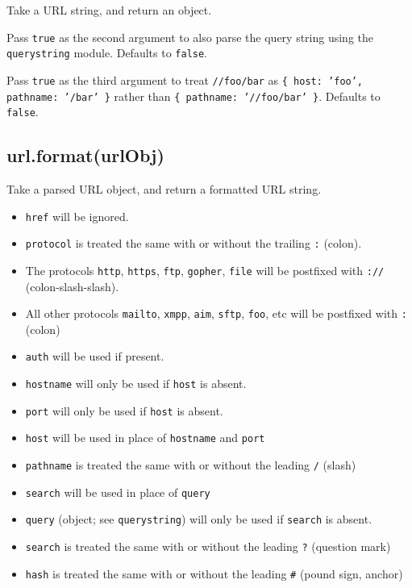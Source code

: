 Take a URL string, and return an object.

Pass \texttt{true} as the second argument to also parse the query string
using the \texttt{querystring} module. Defaults to \texttt{false}.

Pass \texttt{true} as the third argument to treat \texttt{//foo/bar} as
\texttt{\{ host: 'foo', pathname: '/bar' \}} rather than
\texttt{\{ pathname: '//foo/bar' \}}. Defaults to \texttt{false}.

\subsection{url.format(urlObj)}\label{url.formaturlobj}

Take a parsed URL object, and return a formatted URL string.

\begin{itemize}
\itemsep1pt\parskip0pt
\item
  \texttt{href} will be ignored.
\item
  \texttt{protocol} is treated the same with or without the trailing
  \texttt{:} (colon).
\item
  The protocols \texttt{http}, \texttt{https}, \texttt{ftp},
  \texttt{gopher}, \texttt{file} will be postfixed with \texttt{://}
  (colon-slash-slash).
\item
  All other protocols \texttt{mailto}, \texttt{xmpp}, \texttt{aim},
  \texttt{sftp}, \texttt{foo}, etc will be postfixed with \texttt{:}
  (colon)
\item
  \texttt{auth} will be used if present.
\item
  \texttt{hostname} will only be used if \texttt{host} is absent.
\item
  \texttt{port} will only be used if \texttt{host} is absent.
\item
  \texttt{host} will be used in place of \texttt{hostname} and
  \texttt{port}
\item
  \texttt{pathname} is treated the same with or without the leading
  \texttt{/} (slash)
\item
  \texttt{search} will be used in place of \texttt{query}
\item
  \texttt{query} (object; see \texttt{querystring}) will only be used if
  \texttt{search} is absent.
\item
  \texttt{search} is treated the same with or without the leading
  \texttt{?} (question mark)
\item
  \texttt{hash} is treated the same with or without the leading
  \texttt{\#} (pound sign, anchor)
\end{itemize}

